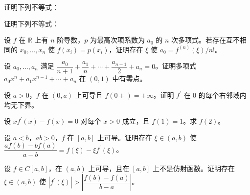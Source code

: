\newpage
\noindent\begin{minipage}{\textwidth}
证明下列不等式：
\end{minipage}\par\vfill
\noindent\begin{minipage}{\textwidth}
证明下列不等式：
\end{minipage}\par\vfill
\noindent\begin{minipage}{\textwidth}
设 $f$ 在 $\mathbb R$ 上有 $n$ 阶导数，$p$ 为最高次项系数为 $a_0$ 的 $n$ 次多项式。若存在互不相同的 $x_0,\ldots,x_n$ 使 $f(x_i)=p(x_i)$，证明存在 $\xi$ 使 $a_0=f^{(n)}(\xi)/n!$。
\end{minipage}\par\vfill
\newpage
\noindent\begin{minipage}{\textwidth}
设 $a_0,\ldots,a_n$ 满足 $\dfrac{a_0}{n+1}+\dfrac{a_1}n+\cdots+\dfrac{a_{n-1}}2+a_n=0$。证明多项式 $a_0x^n+a_1x^{n-1}+\cdots+a_n$ 在 $(0,1)$ 中有零点。
\end{minipage}\par\vfill
\noindent\begin{minipage}{\textwidth}
设 $a>0$，$f$ 在 $(0,a)$ 上可导且 $f(0+)=+\infty$。证明 $f^{\prime}$ 在 $0$ 的每个右邻域内均无下界。
\end{minipage}\par\vfill
\noindent\begin{minipage}{\textwidth}
设 $xf^{\prime}(x)-f(x)=0$ 对每个 $x>0$ 成立，且 $f(1)=1$。求 $f(2)$。
\end{minipage}\par\vfill
\newpage
\noindent\begin{minipage}{\textwidth}
设 $a<b$，$ab>0$，$f$ 在 $[a,b]$ 上可导。证明存在 $\xi\in(a,b)$ 使 $\dfrac{af(b)-bf(a)}{a-b}=f(\xi)-\xi f^{\prime}(\xi)$。
\end{minipage}\par\vfill
\noindent\begin{minipage}{\textwidth}
设 $f\in C[a,b]$，在 $(a,b)$ 上可导，且在 $[a,b]$ 上不是仿射函数。证明存在 $\xi\in(a,b)$ 使 $|f^{\prime}(\xi)|>\left|\dfrac{f(b)-f(a)}{b-a}\right|$。
\end{minipage}\par\vfill
